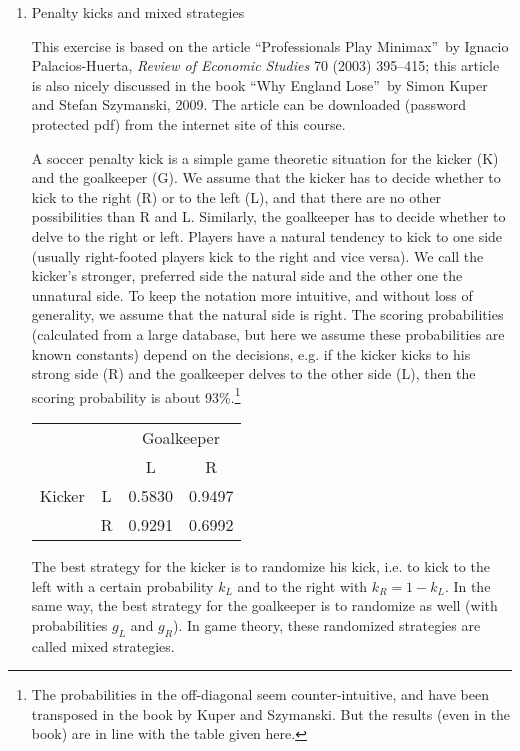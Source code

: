\begin{enumerate}
\item Penalty kicks and mixed strategies

This exercise is based on the article \textquotedblleft Professionals Play
Minimax\textquotedblright\ by Ignacio Palacios-Huerta, \emph{Review of
Economic Studies} 70 (2003) 395--415; this article is also nicely discussed
in the book \textquotedblleft Why England Lose\textquotedblright\ by Simon
Kuper and Stefan Szymanski, 2009. The article can be downloaded (password
protected pdf) from the internet site of this course.

A soccer penalty kick is a simple game theoretic situation for the kicker
(K) and the goalkeeper (G). We assume that the kicker has to decide whether
to kick to the right (R) or to the left (L), and that there are no
other possibilities than R and L. Similarly, the goalkeeper has to decide
whether to delve to the right or left. Players have a natural tendency to
kick to one side (usually right-footed players kick to the right and vice
versa). We call the kicker's stronger, preferred side the natural side and
the other one the unnatural side. To keep the notation more intuitive, and
without loss of generality, we assume that the natural side is right. The
scoring probabilities (calculated from a large database, but here we assume
these probabilities are known constants) depend on the decisions, e.g. if
the kicker kicks to his strong side (R) and the goalkeeper delves to the
other side (L), then the scoring probability is about 93\%.\footnote{The 
probabilities in the off-diagonal seem counter-intuitive, and have been
transposed in the book by Kuper and Szymanski. But the results (even in the
book) are in line with the table given here.}

\begin{center}
\begin{tabular}{cc|cc}
&  & \multicolumn{2}{|c}{Goalkeeper} \\
&  & L & R \\ \cline{2-4}
Kicker & L & 0.5830 & 0.9497 \\
& R & 0.9291 & 0.6992
\end{tabular}
\end{center}

The best strategy for the kicker is to randomize his kick, i.e. to kick to
the left with a certain probability $k_{L}$ and to the right with 
$k_{R}=1-k_{L}$. In the same way, the best strategy for the goalkeeper is to
randomize as well (with probabilities $g_{L}$ and $g_{R}$). In game theory,
these randomized strategies are called mixed strategies.


\end{enumerate}
